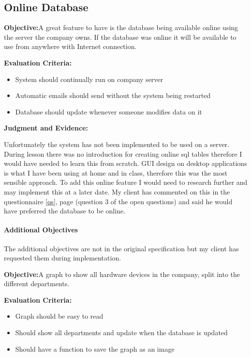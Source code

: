 \subsection{Online Database}

\textbf{Objective:}A great feature to have is the database being available online using the server the company owns. If the database was online it will be available to use from anywhere with Internet connection.

\textbf{Evaluation Criteria:}
\begin{itemize}
\item{System should continually run on company server}
\item{Automatic emails should send without the system being restarted}
\item{Database should update whenever someone modifies data on it}
\end{itemize}

\textbf{Judgment and Evidence:}

Unfortunately the system has not been implemented to be used on a server.  During lesson there was no introduction for creating online sql tables therefore I would have needed to learn this from scratch. GUI design on desktop applications is what I have been using at home and in class, therefore this was the most sensible approach. To add this online feature I would need to research further and may implement this at a later date. My client has commented on this in the questionnaire \ref{qs}, page \pageref{qs} (question 3 of the open questions) and said he would have preferred the database to be online.

\paragraph{Additional Objectives}

The additional objectives are not in the original specification but my client has requested them during implementation.

\textbf{Objective:}A graph to show all hardware devices in the company, split into the different departments.

\textbf{Evaluation Criteria:}
\begin{itemize}
\item{Graph should be easy to read}
\item{Should show all departments and update when the database is updated}
\item{Should have a function to save the graph as an image}
\end{itemize}

